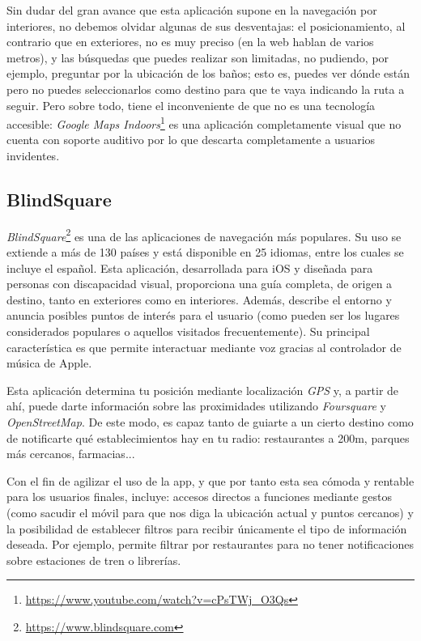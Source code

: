Sin dudar del gran avance que esta aplicación supone en la navegación por interiores, no debemos olvidar algunas de sus desventajas: el posicionamiento, al contrario que en exteriores, no es muy preciso (en la web hablan de varios metros), y las búsquedas que puedes realizar son limitadas, no pudiendo, por ejemplo, preguntar por la ubicación de los baños; esto es, puedes ver dónde están pero no puedes seleccionarlos como destino para que te vaya indicando la ruta a seguir. Pero sobre todo, tiene el inconveniente de que no es una tecnología accesible: \textit{Google Maps Indoors}\footnote{\url{https://www.youtube.com/watch?v=cPsTWj_O3Qs}} es una aplicación completamente visual que no cuenta con soporte auditivo por lo que descarta completamente a usuarios invidentes.



\subsection{BlindSquare}
\textit{BlindSquare}\footnote{\url{https://www.blindsquare.com}} es una de las aplicaciones de navegación más populares. Su uso se extiende a más de 130 países y está disponible en 25 idiomas, entre los cuales se incluye el español. Esta aplicación, desarrollada para iOS y diseñada para personas con discapacidad visual, proporciona una guía completa, de origen a destino, tanto en exteriores como en interiores. Además, describe el entorno y anuncia posibles puntos de interés para el usuario (como pueden ser los lugares considerados populares o aquellos visitados frecuentemente). Su principal característica es que permite interactuar mediante voz gracias al controlador de música de Apple. 

Esta aplicación determina tu posición mediante localización \textit{GPS} y, a partir de ahí, puede darte información sobre las proximidades utilizando \textit{Foursquare} y \textit{OpenStreetMap}. De este modo, es capaz tanto de guiarte a un cierto destino como de notificarte qué establecimientos hay en tu radio: restaurantes a 200m, parques más cercanos, farmacias...

Con el fin de agilizar el uso de la app, y que por tanto esta sea cómoda y rentable para los usuarios finales, incluye: accesos directos a funciones mediante gestos (como sacudir el móvil para que nos diga la ubicación actual y puntos cercanos) y la posibilidad de establecer filtros para recibir únicamente el tipo de información deseada. Por ejemplo, permite filtrar por restaurantes para no tener notificaciones sobre estaciones de tren o librerías.

